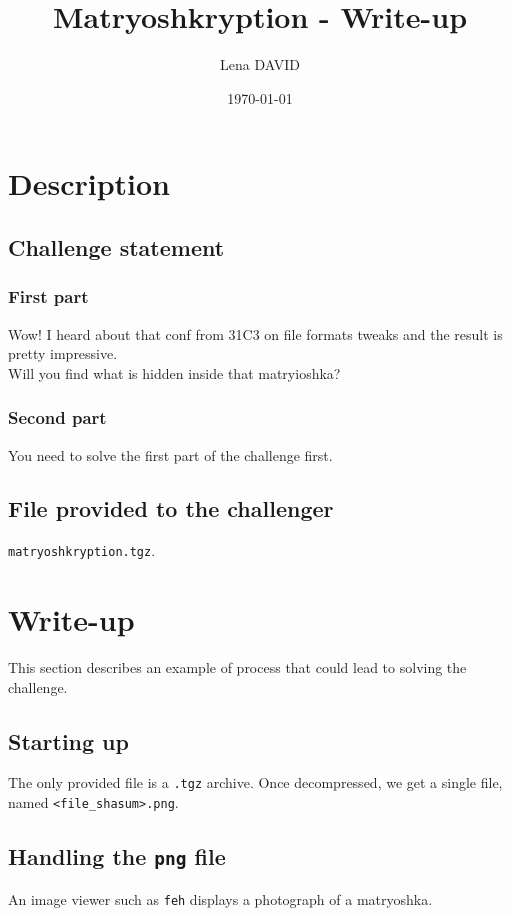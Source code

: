 \documentclass[12pt,a4paper]{article}
\author{Lena DAVID}
\title{Matryoshkryption - Write-up}
\date{\today}
\begin{document}
\maketitle
\vspace{4em}

\section{Description}
    \subsection{Challenge statement}
        \subsubsection{First part}
    Wow! I heard about that conf from 31C3 on file formats tweaks and the result
    is pretty impressive.\\

    Will you find what is hidden inside that matryioshka?

        \subsubsection{Second part}
    You need to solve the first part of the challenge first.

    \subsection{File provided to the challenger}
        \texttt{matryoshkryption.tgz}.

\section{Write-up}
    This section describes an example of process that could lead to solving the
    challenge.\\

    \subsection{Starting up}
    The only provided file is a \texttt{.tgz} archive.
    Once decompressed, we get a single file, named \texttt{<file\_shasum>.png}.

    \subsection{Handling the \texttt{png} file}
    An image viewer such as \texttt{feh} displays a photograph of a matryoshka.
\end{document}
